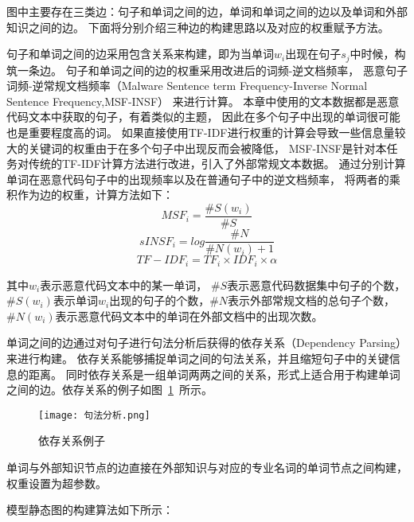 图中主要存在三类边：句子和单词之间的边，单词和单词之间的边以及单词和外部知识之间的边。
下面将分别介绍三种边的构建思路以及对应的权重赋予方法。

句子和单词之间的边采用包含关系来构建，即为当单词$w_i$出现在句子$s_j$中时候，构筑一条边。
句子和单词之间的边的权重采用改进后的词频-逆文档频率，
恶意句子词频-逆常规文档频率（Malware Sentence term Frequency-Inverse Normal Sentence Frequency,MSF-INSF）
来进行计算。
本章中使用的文本数据都是恶意代码文本中获取的句子，有着类似的主题，
因此在多个句子中出现的单词很可能也是重要程度高的词。
如果直接使用TF-IDF进行权重的计算会导致一些信息量较大的关键词的权重由于在多个句子中出现反而会被降低，
MSF-INSF是针对本任务对传统的TF-IDF计算方法进行改进，引入了外部常规文本数据。
通过分别计算单词在恶意代码句子中的出现频率以及在普通句子中的逆文档频率，
将两者的乘积作为边的权重，计算方法如下：
\begin{equation}
	\label{TF}
	MSF_i = \frac{\#S(w_i)}{\#S}
\end{equation}
\begin{equation}s
	\label{IDF}
	INSF_i = log\frac{\#N}{\#N(w_i)+1}
\end{equation}
\begin{equation}
	TF-IDF_i=TF_i \times IDF_i \times \alpha
\end{equation}

其中$w_i$表示恶意代码文本中的某一单词，
$\#S$表示恶意代码数据集中句子的个数，$\#S(w_i)$表示单词$w_i$出现的句子的个数，$\#N$表示外部常规文档的总句子个数，
$\#N(w_i)$表示恶意代码文本中的单词在外部文档中的出现次数。

单词之间的边通过对句子进行句法分析后获得的依存关系（Dependency Parsing）来进行构建。
依存关系能够捕捉单词之间的句法关系，并且缩短句子中的关键信息的距离。
同时依存关系是一组单词两两之间的关系，形式上适合用于构建单词之间的边。依存关系的例子如图~\ref{fig:dep}~所示。

\begin{figure}[htb]
	\centering
	\texttt{[image: 句法分析.png]}
	\caption{依存关系例子}
	\label{fig:dep}
\end{figure}

单词与外部知识节点的边直接在外部知识与对应的专业名词的单词节点之间构建，权重设置为超参数。

模型静态图的构建算法如下所示：

